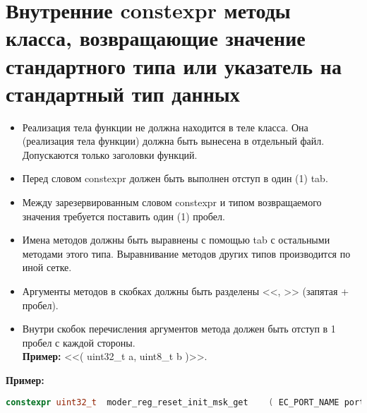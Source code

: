 \section{Внутренние constexpr методы класса, возвращающие значение стандартного типа или указатель на стандартный тип данных}\label{zp:constexpr:s}
\begin{itemize}
	\item Реализация тела функции не должна находится в теле класса. Она (реализация тела функции) должна быть вынесена в отдельный файл. Допускаются только заголовки функций.
	\item Перед словом constexpr должен быть выполнен отступ в один (1) tab.
	\item Между зарезервированным словом constexpr и типом возвращаемого значения требуется поставить один (1) пробел.
	\item Имена методов должны быть выравнены с помощью tab с остальными методами этого типа. Выравнивание методов других типов производится по иной сетке.
	\item Аргументы методов в скобках должны быть разделены <<, >> (запятая + пробел).
	\item Внутри скобок перечисления аргументов метода должен быть отступ в 1 пробел с каждой стороны.\\\textbf{Пример: } <<( uint32\_t a, uint8\_t b )>>.
\end{itemize}
\textbf{Пример:}\begin{lstlisting}[language=C++, frame=tlBR, basicstyle=\fontsize{10}{10}\ttfamily]
	constexpr uint32_t	moder_reg_reset_init_msk_get	( EC_PORT_NAME port_name );
\end{lstlisting}


